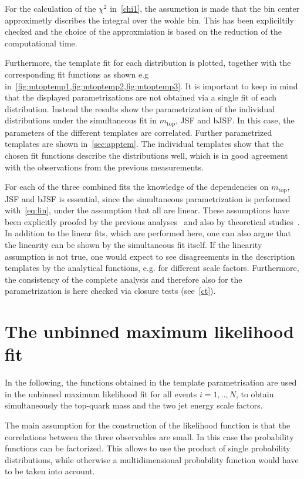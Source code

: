 For the calculation of the $\chi^2$ in~\cref{chi1}, the assumetion is made that the bin center approximetly discribes the integral over the wohle bin. This has been expliciltily checked and the choice of the approxmiation is based on the reduction of the computational time. 

Furthermore, the template fit for each distribution is plotted, together with the corresponding fit functions as shown e.g in~\cref{fig:mtoptemp1,fig:mtoptemp2,fig:mtoptemp3}. It is important to keep in mind that the displayed parametrizations are not obtained via a single fit of each distribution. Instead the results show the parametrization of the individual distributions under the simultaneous fit in $m_{\text{top}}$, JSF and bJSF. In this case, the parameters of the different templates are correlated. Further parametrized templates are shown in~\cref{sec:apptem}. The individual templates show that the chosen fit functions describe the distributions well, which is in good agreement with the observations from the previous measurements.

For each of the three combined fits the knowledge of the dependencies on $m_{\text{top}}$, JSF and bJSF is essential, since the simultaneous parametrization is performed with~\cref{eq:lin}, under the assumption that all  are linear. 
These assumptions have been explicitly proofed by the previous analyses~\cite{Aad:2015nba,ATLAS-CONF-2017-071}  and also by theoretical studies~\cite{Heinrich:2017bqp}. In addition to the linear fits, which are performed here, one can also argue that the linearity can be shown by the simultaneous fit itself.  If the linearity assumption is not true, one would expect to see disagreements in the description  templates by the analytical functions, e.g. for different scale factors. Furthermore, the consistency of the complete analysis and therefore also for the parametrization is here checked via closure tests (see~\cref{ct}).




 
 




\section{The unbinned maximum likelihood fit}

In the following, the functions obtained in the template parametrisation are used in the unbinned maximum likelihood fit
for all events $i = 1,..,N$, to obtain simultaneously the top-quark mass and the two jet energy scale factors. 
 
 The main assumption for the construction of the likelihood function is that the correlations between the three observables are small. In this case the probability  functions can be factorized. This allows to use the product of single probability distributions, while otherwise a multidimensional probability function would have to be taken into account.



